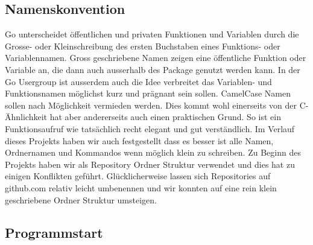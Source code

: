 \subsection{Namenskonvention}
Go unterscheidet öffentlichen und privaten Funktionen und Variablen durch die Grosse- oder Kleinschreibung des ersten Buchstaben eines Funktions- oder Variablennamen. Gross geschriebene Namen zeigen eine öffentliche Funktion oder Variable an, die dann auch ausserhalb des Package genutzt werden kann.
In der Go Usergroup ist ausserdem auch die Idee verbreitet das Variablen- und Funktionsnamen möglichst kurz und prägnant sein sollen. CamelCase Namen sollen nach Möglichkeit vermieden werden. Dies kommt wohl einerseits von der C-Ähnlichkeit hat aber andererseits auch einen praktischen Grund. So ist ein Funktionsaufruf wie  tatsächlich recht elegant und gut verständlich.
Im Verlauf dieses Projekts haben wir auch festgestellt dass es besser ist alle Namen, Ordnernamen und Kommandos wenn möglich klein zu schreiben. Zu Beginn des Projekts haben wir  als Repository Ordner Struktur verwendet und dies hat zu einigen Konflikten geführt. Glücklicherweise lassen sich Repositories auf github.com relativ leicht umbenennen und wir konnten auf eine rein klein geschriebene Ordner Struktur umsteigen.

\subsection{Programmstart}


